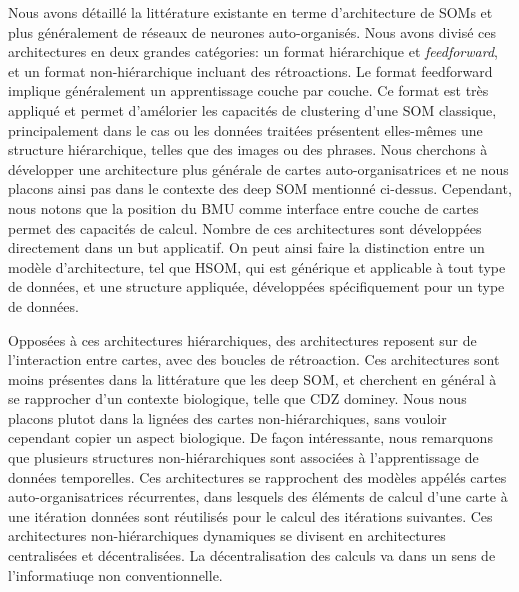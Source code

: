 \documentclass[../main]{subfiles}
\begin{document}
Nous avons détaillé la littérature existante en terme d'architecture de SOMs et plus généralement de réseaux de neurones auto-organisés. Nous avons divisé ces architectures en deux grandes catégories: un format hiérarchique et \emph{feedforward}, et un format non-hiérarchique incluant des rétroactions.
Le format feedforward implique généralement un apprentissage couche par couche. Ce format est très appliqué et permet d'amélorier les capacités de clustering d'une SOM classique, principalement dans le cas ou les données traitées présentent elles-mêmes une structure hiérarchique, telles que des images ou des phrases.
Nous cherchons à développer une architecture plus générale de cartes auto-organisatrices et ne nous placons ainsi pas dans le contexte des deep SOM mentionné ci-dessus. 
Cependant, nous notons que la position du BMU comme interface entre couche de cartes permet des capacités de calcul.
Nombre de ces architectures sont développées directement dans un but applicatif. On peut ainsi faire la distinction entre un modèle d'architecture, tel que HSOM, qui est générique et applicable à tout type de données, et une structure appliquée, développées spécifiquement pour un type de données.

Opposées à ces architectures hiérarchiques, des architectures reposent sur de l'interaction entre cartes, avec des boucles de rétroaction.
Ces architectures sont moins présentes dans la littérature que les deep SOM, et cherchent en général à se rapprocher d'un contexte biologique, telle que CDZ dominey.
Nous nous placons plutot dans la lignées des cartes non-hiérarchiques, sans vouloir cependant copier un aspect biologique.
De façon intéressante, nous remarquons que plusieurs structures non-hiérarchiques sont associées à l'apprentissage de données temporelles. Ces architectures se rapprochent des modèles appélés cartes auto-organisatrices récurrentes, dans lesquels des éléments de calcul d'une carte à une itération données sont réutilisés pour le calcul des itérations suivantes.
Ces architectures non-hiérarchiques dynamiques se divisent en architectures centralisées et décentralisées. La décentralisation des calculs va dans un sens de l'informatiuqe non conventionnelle.
\end{document}
